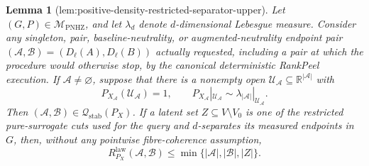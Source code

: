 \documentclass{article}
\newtheorem{lemma}{Lemma}
\begin{document}
\begin{lemma}[lem:positive-density-restricted-separator-upper]\label{lem:positive-density-restricted-separator-upper}
Let \((G,P)\in\mathcal M_{\mathrm{PNHZ}}\), and let \(\lambda_d\) denote \(d\)-dimensional Lebesgue measure.  Consider any singleton, pair, baseline-neutrality, or augmented-neutrality endpoint pair \((\mathcal A,\mathcal B)=(D_\ell(A),D_\ell(B))\) actually requested, including a pair at which the procedure would otherwise stop, by the canonical deterministic RankPeel execution.  If \(\mathcal A\neq\varnothing\), suppose that there is a nonempty open \(\mathcal U_{\mathcal A}\subseteq\mathbb R^{|\mathcal A|}\) with
\[
 P_{X_{\mathcal A}}(\mathcal U_{\mathcal A})=1,
 \qquad
 P_{X_{\mathcal A}}|_{\mathcal U_{\mathcal A}}
 \sim \lambda_{|\mathcal A|}|_{\mathcal U_{\mathcal A}}.
\]
Then \((\mathcal A,\mathcal B)\in\mathcal Q_{\mathrm{stab}}(P_X)\).  If a latent set \(Z\subseteq V\setminus V_0\) is one of the restricted pure-surrogate cuts used for the query and \(d\)-separates its measured endpoints in \(G\), then, without any pointwise fibre-coherence assumption,
\[
 R^{\mathrm{law}}_{P_X}(\mathcal A,\mathcal B)
 \leq\min\{|\mathcal A|,|\mathcal B|,|Z|\}.
\]
\end{lemma}
\end{document}
